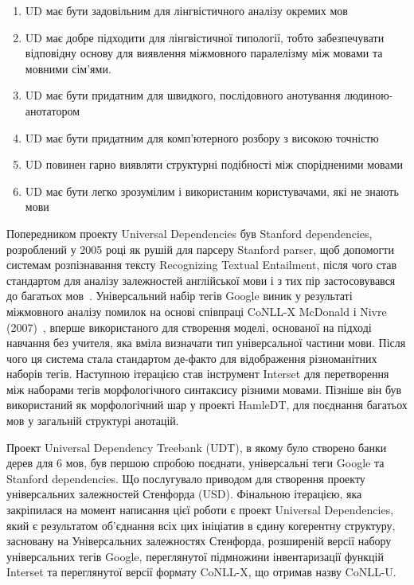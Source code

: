 \begin{enumerate}
    \item UD має бути задовільним для лінгвістичного аналізу окремих мов
    \item UD має добре підходити для лінгвістичної типології, тобто 
    забезпечувати відповідну основу для виявлення міжмовного паралелізму між
    мовами та мовними сім’ями.
    \item UD має бути придатним для швидкого, послідовного анотування людиною-анотатором
    \item UD має бути придатним для комп'ютерного розбору з високою точністю
    \item UD повинен гарно виявляти структурні подібності між спорідненими мовами
    \item UD має бути легко зрозумілим і використаним користувачами, які не знають мови
\end{enumerate}

Попередником проекту Universal Dependencies був Stanford dependencies, розроблений у 2005 році як рушій для парсеру Stanford parser, щоб допомогти системам розпізнавання тексту Recognizing Textual Entailment, після чого став стандартом для аналізу залежностей англійської мови і з тих пір застосовувався до багатьох мов~\cite{bib9}. Універсальний набір тегів Google виник у результаті міжмовного аналізу помилок на основі співпраці CoNLL-X McDonald і Nivre (2007)~\cite{bib10}, вперше використаного для створення моделі, основаної на підході навчання без учителя, яка вміла визначати тип універсальної частини мови. Після чого ця система стала стандартом де-факто для відображення різноманітних наборів тегів. Наступною ітерацією став інструмент Interset для перетворення між наборами тегів морфологічного синтаксису різними мовами. Пізніше він був використаний як морфологічний шар у проекті HamleDT, для поєднання багатьох мов у загальній структурі анотацій.

Проект Universal Dependency Treebank (UDT), в якому було створено банки дерев для 6 мов, був першою спробою поєднати, універсальні теги Google та Stanford dependencies. Що послугувало приводом для створення проекту універсальних залежностей Стенфорда (USD). Фінальною ітерацією, яка закріпилася на момент написання цієї роботи є проект Universal Dependencies, який є результатом об’єднання всіх цих ініціатив в єдину когерентну структуру, засновану на Універсальних залежностях Стенфорда, розширеній версії набору універсальних тегів Google, переглянутої підмножини інвентаризації функцій Interset та переглянутої версії формату CoNLL-X, що отримав назву CoNLL-U.

